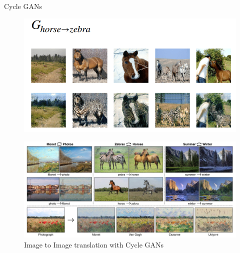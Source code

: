 \begin{frame}[allowframebreaks]{Cycle GANs}
\framebreak
\begin{figure}
    \centering
    \includegraphics[height=0.9\textheight, width=\textwidth, keepaspectratio]{images/gan/cycle_gan_5.png}
\end{figure}

\framebreak
\begin{figure}
    \centering
    \includegraphics[height=0.9\textheight, width=\textwidth, keepaspectratio]{images/gan/cycle_gan_6.png}
    \caption*{Image to Image translation with Cycle GANs}
\end{figure}
\end{frame}